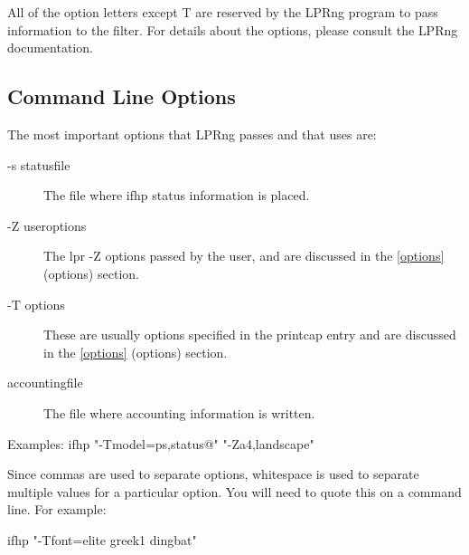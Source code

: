 \documentclass[a4paper]{article}
\begin{document}
All of the option letters except {\ttfamily T} are reserved by the {\ttfamily LPRng}
program to pass information to the filter.
For details about the options,  please consult the {\ttfamily LPRng} documentation.


\subsection{Command Line Options}

The most important options that LPRng passes and that uses are:
\begin{description}
\item[-s statusfile] \mbox{}

The file where {\ttfamily ifhp} status information is placed.

\item[-Z useroptions] \mbox{}

The {\ttfamily lpr -Z} options passed by the user, and are discussed in
the \ref{options} {(options)} section.

\item[-T options] \mbox{}

These are usually options specified in the printcap entry
and are discussed in
the \ref{options} {(options)} section.

\item[accountingfile] \mbox{}

The file where accounting information is written.

\end{description}


\begin{tscreen}
Examples:
ifhp "-Tmodel=ps,status@" "-Za4,landscape"
\end{tscreen}


Since commas are used to separate options,
whitespace is used to separate multiple values
for a particular option.
You will need to quote this on a command line. For example:
\begin{tscreen}
ifhp "-Tfont=elite greek1 dingbat"
\end{tscreen}
\end{document}
